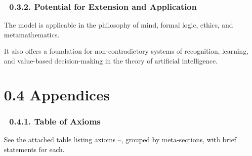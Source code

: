 \documentclass[12pt]{article}
\begin{document}
\subsubsection*{🔹 0.3.2. Potential for Extension and Application}

The model is applicable in the philosophy of mind, formal logic, ethics, and metamathematics.

It also offers a foundation for non-contradictory systems of recognition, learning, and value-based decision-making in the theory of artificial intelligence.

\section*{0.4 Appendices}

\subsubsection*{🔹 0.4.1. Table of Axioms}

See the attached table listing axioms \text{[1]}–\text{[28]}, grouped by meta-sections, with brief statements for each.
\end{document}

